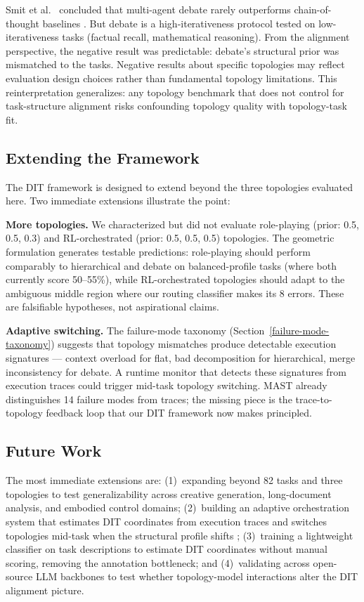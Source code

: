 Smit et al.~\cite{smit_2024} concluded that multi-agent debate rarely outperforms chain-of-thought baselines \cite{wei_2022}. But debate is a high-iterativeness protocol tested on low-iterativeness tasks (factual recall, mathematical reasoning). From the alignment perspective, the negative result was predictable: debate's structural prior was mismatched to the tasks. Negative results about specific topologies may reflect evaluation design choices rather than fundamental topology limitations. This reinterpretation generalizes: any topology benchmark that does not control for task-structure alignment risks confounding topology quality with topology-task fit.

\subsection{Extending the Framework}\label{extending-the-framework}

The DIT framework is designed to extend beyond the three topologies evaluated here. Two immediate extensions illustrate the point:

\textbf{More topologies.} We characterized but did not evaluate role-playing (prior: 0.5, 0.5, 0.3) and RL-orchestrated (prior: 0.5, 0.5, 0.5) topologies. The geometric formulation generates testable predictions: role-playing should perform comparably to hierarchical and debate on balanced-profile tasks (where both currently score 50--55\%), while RL-orchestrated topologies should adapt to the ambiguous middle region where our routing classifier makes its 8 errors. These are falsifiable hypotheses, not aspirational claims.

\textbf{Adaptive switching.} The failure-mode taxonomy (Section~\ref{failure-mode-taxonomy}) suggests that topology mismatches produce detectable execution signatures --- context overload for flat, bad decomposition for hierarchical, merge inconsistency for debate. A runtime monitor that detects these signatures from execution traces could trigger mid-task topology switching. MAST \cite{cemri_2025} already distinguishes 14 failure modes from traces; the missing piece is the trace-to-topology feedback loop that our DIT framework now makes principled.

\subsection{Future Work}\label{future-work}

The most immediate extensions are: (1)~expanding beyond 82 tasks and three topologies to test generalizability across creative generation, long-document analysis, and embodied control domains; (2)~building an adaptive orchestration system that estimates DIT coordinates from execution traces and switches topologies mid-task when the structural profile shifts \cite{kim_2024}; (3)~training a lightweight classifier on task descriptions to estimate DIT coordinates without manual scoring, removing the annotation bottleneck; and (4)~validating across open-source LLM backbones \cite{cemri_2025} to test whether topology-model interactions alter the DIT alignment picture.

